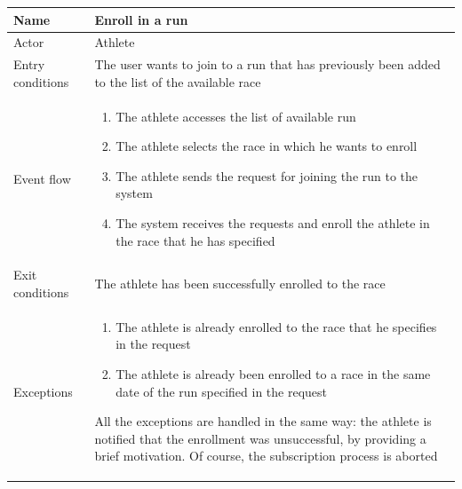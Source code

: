 \begin{table}[H]
\begin{tabularx}{\textwidth}{|l|X|}
\hline
 Name & Enroll in a run \\ \hline
 Actor & Athlete \\ \hline
 Entry conditions & The user wants to join to a run that has previously been added to the list of the available race \\ \hline
 Event flow & 
 \begin{enumerate}
 	\item The athlete accesses the list of available run
  	\item The athlete selects the race in which he wants to enroll
 	\item The athlete sends the request for joining the run to the system 
 	\item The system receives the requests and enroll the athlete in the race that he has specified 
 \end{enumerate}   \\ \hline
 Exit conditions & The athlete has been successfully enrolled to the race \\ \hline
 Exceptions &  
 \begin{enumerate}
 	\item The athlete is already enrolled to the race that he specifies in the request
 	\item The athlete is already been enrolled to a race in the same date of the run specified in the request 
 \end{enumerate}
 All the exceptions are handled in the same way: the athlete is notified that the enrollment was unsuccessful, by providing a brief motivation. Of course, the subscription process is aborted  
 \\ \hline
\end{tabularx}
\end{table}


